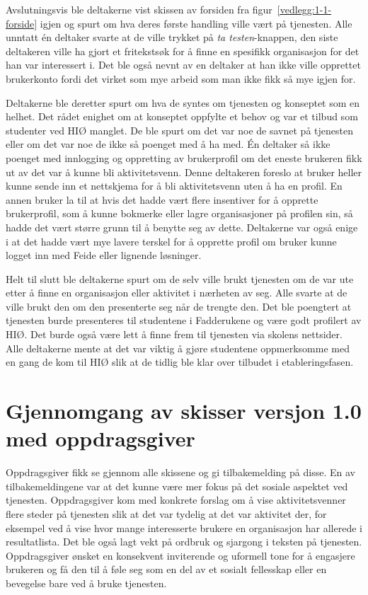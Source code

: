 Avslutningsvis ble deltakerne vist skissen av forsiden fra figur~\ref{vedlegg:1-1-forside} igjen og spurt om hva deres første handling ville vært på tjenesten. Alle unntatt én deltaker svarte at de ville trykket på {\em  ta testen}-knappen, den siste deltakeren ville ha gjort et fritekstsøk for å finne en spesifikk organisasjon for det han var interessert i. Det ble også nevnt av en deltaker at han ikke ville opprettet brukerkonto fordi det virket som mye arbeid som man ikke fikk så mye igjen for.

Deltakerne ble deretter spurt om hva de syntes om tjenesten og konseptet som en helhet. Det rådet enighet om at konseptet oppfylte et behov og var et tilbud som studenter ved HIØ manglet. De ble spurt om det var noe de savnet på tjenesten eller om det var noe de ikke så poenget med å ha med. Én deltaker så ikke poenget med innlogging og oppretting av brukerprofil om det eneste brukeren fikk ut av det var å kunne bli aktivitetsvenn. Denne deltakeren foreslo at bruker heller kunne sende inn et nettskjema for å bli aktivitetsvenn uten å ha en profil. En annen bruker la til at hvis det hadde vært flere insentiver for å opprette brukerprofil, som å kunne bokmerke eller lagre organisasjoner på profilen sin, så hadde det vært større grunn til å benytte seg av dette. Deltakerne var også enige i at det hadde vært mye lavere terskel for å opprette profil om bruker kunne logget inn med Feide eller lignende løsninger.

Helt til slutt ble deltakerne spurt om de selv ville brukt tjenesten om de var ute etter å finne en organisasjon eller aktivitet i nærheten av seg. Alle svarte at de ville brukt den om den presenterte seg når de trengte den. Det ble poengtert at tjenesten burde presenteres til studentene i Fadderukene og være godt profilert av HIØ. Det burde også være lett å finne frem til tjenesten via skolens nettsider. Alle deltakerne mente at det var viktig å gjøre studentene oppmerksomme med en gang de kom til HIØ slik at de tidlig ble klar over tilbudet i etableringsfasen.

\section{Gjennomgang av skisser versjon 1.0 med oppdragsgiver}
\label{section:skisser1.0-oppdragsgiver}

Oppdragsgiver fikk se gjennom alle skissene og gi tilbakemelding på disse. En av tilbakemeldingene var at det kunne være mer fokus på det sosiale aspektet ved tjenesten. Oppdragsgiver kom med konkrete forslag om å vise aktivitetsvenner flere steder på tjenesten slik at det var tydelig at det var aktivitet der, for eksempel ved å vise hvor mange interesserte brukere en organisasjon har allerede i resultatlista. Det ble også lagt vekt på ordbruk og sjargong i teksten på tjenesten. Oppdragsgiver ønsket en konsekvent inviterende og uformell tone for å engasjere brukeren og få den til å føle seg som en del av et sosialt fellesskap eller en bevegelse bare ved å bruke tjenesten.

